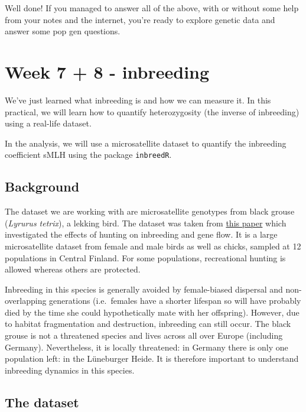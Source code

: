 \documentclass[
  letterpaper,
  DIV=11,
  numbers=noendperiod]{scrreprt}
\begin{document}
Well done! If you managed to answer all of the above, with or without
some help from your notes and the internet, you're ready to explore
genetic data and answer some pop gen questions.


\chapter{Week 7 + 8 - inbreeding}\label{week-7-8---inbreeding}

We've just learned what inbreeding is and how we can measure it. In this
practical, we will learn how to quantify heterozygosity (the inverse of
inbreeding) using a real-life dataset.

In the analysis, we will use a microsatellite dataset to quantify the
inbreeding coefficient sMLH using the package \texttt{inbreedR}.

\section{Background}\label{background}

The dataset we are working with are microsatellite genotypes from black
grouse (\emph{Lyrurus tetrix}), a lekking bird. The dataset was taken
from \href{https://onlinelibrary.wiley.com/doi/10.1111/eva.1352}{this
paper} which investigated the effects of hunting on inbreeding and gene
flow. It is a large microsatellite dataset from female and male birds as
well as chicks, sampled at 12 populations in Central Finland. For some
populations, recreational hunting is allowed whereas others are
protected.

Inbreeding in this species is generally avoided by female-biased
dispersal and non-overlapping generations (i.e.~females have a shorter
lifespan so will have probably died by the time she could hypothetically
mate with her offspring). However, due to habitat fragmentation and
destruction, inbreeding can still occur. The black grouse is not a
threatened species and lives across all over Europe (including Germany).
Nevertheless, it is locally threatened: in Germany there is only one
population left: in the Lüneburger Heide. It is therefore important to
understand inbreeding dynamics in this species.

\section{The dataset}\label{the-dataset}
\end{document}

